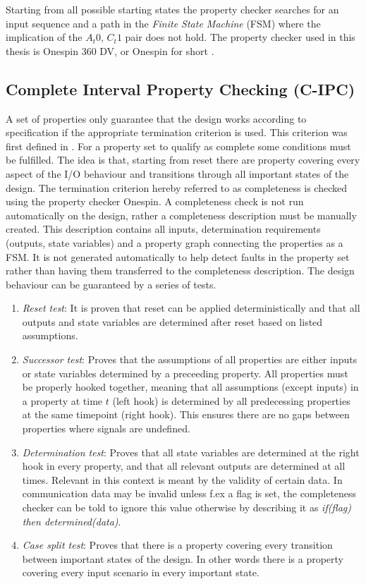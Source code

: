 Starting from all possible starting states the property checker searches for an input sequence and a path in the \textit{Finite State Machine} (FSM) where the implication of the $A_t0$, $C_t1$ pair does not hold. The property checker used in this thesis is Onespin 360 DV, or Onespin for short \cite{onespin}. 

\subsection{Complete Interval Property Checking (C-IPC)}
\label{subsec:cipc}
A set of properties only guarantee that the design works according to specification if the appropriate termination criterion is used. This criterion was first defined in \cite{bormannbusch}. For a property set to qualify as complete some conditions must be fulfilled. The idea is that, starting from reset there are property covering every aspect of the I/O behaviour and transitions through all important states of the design. The termination criterion hereby referred to as completeness is checked using the property checker Onespin. A completeness check is not run automatically on the design, rather a completeness description must be manually created. This description contains all inputs, determination requirements (outputs, state variables) and a property graph connecting the properties as a FSM. It is not generated automatically to help detect faults in the property set rather than having them transferred to the completeness description. The design behaviour can be guaranteed by a series of tests.
\begin{enumerate}
 \item \textit{Reset test}: It is proven that reset can be applied deterministically and that all outputs and state variables are determined after reset based on listed assumptions.
 \item \textit{Successor test}: Proves that the assumptions of all properties are either inputs or state variables determined by a preceeding property. All properties must be properly hooked together, meaning that all assumptions (except inputs) in a property at time $t$ (left hook) is determined by all predecessing properties at the same timepoint (right hook). This ensures there are no gaps between properties where signals are undefined. 
 \item \textit{Determination test}: Proves that all state variables are determined at the right hook in every property, and that all relevant outputs are determined at all times. Relevant in this context is meant by the validity of certain data. In communication data may be invalid unless f.ex a flag is set, the completeness checker can be told to ignore this value otherwise by describing it as \textit{if(flag) then determined(data)}.
 \item \textit{Case split test}: Proves that there is a property covering every transition between important states of the design. In other words there is a property covering every input scenario in every important state. 
\end{enumerate}

